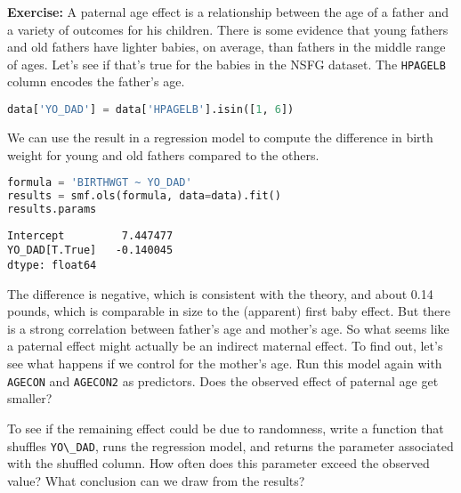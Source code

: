 \textbf{Exercise:} A paternal age effect is a relationship between the
age of a father and a variety of outcomes for his children. There is
some evidence that young fathers and old fathers have lighter babies, on
average, than fathers in the middle range of ages. Let's see if that's
true for the babies in the NSFG dataset. The
\passthrough{\lstinline!HPAGELB!} column encodes the father's age.

\begin{lstlisting}[language=Python,style=source]
data['YO_DAD'] = data['HPAGELB'].isin([1, 6])
\end{lstlisting}

\pagebreak

We can use the result in a regression model to compute the difference in
birth weight for young and old fathers compared to the others.

\begin{lstlisting}[language=Python,style=source]
formula = 'BIRTHWGT ~ YO_DAD'
results = smf.ols(formula, data=data).fit()
results.params
\end{lstlisting}

\begin{lstlisting}[style=output]
Intercept         7.447477
YO_DAD[T.True]   -0.140045
dtype: float64
\end{lstlisting}

The difference is negative, which is consistent with the theory, and
about 0.14 pounds, which is comparable in size to the (apparent) first
baby effect. But there is a strong correlation between father's age and
mother's age. So what seems like a paternal effect might actually be an
indirect maternal effect. To find out, let's see what happens if we
control for the mother's age. Run this model again with
\passthrough{\lstinline!AGECON!} and \passthrough{\lstinline!AGECON2!}
as predictors. Does the observed effect of paternal age get smaller?

To see if the remaining effect could be due to randomness, write a
function that shuffles \passthrough{\lstinline!YO\_DAD!}, runs the
regression model, and returns the parameter associated with the shuffled
column. How often does this parameter exceed the observed value? What
conclusion can we draw from the results?
